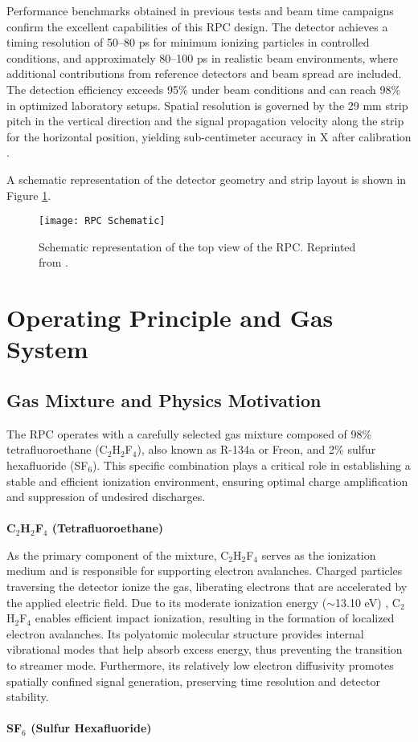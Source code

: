 Performance benchmarks obtained in previous tests and beam time campaigns confirm the excellent capabilities of this RPC design. The detector achieves a timing resolution of 50–80 ps for minimum ionizing particles in controlled conditions, and approximately 80–100 ps in realistic beam environments, where additional contributions from reference detectors and beam spread are included. The detection efficiency exceeds 95\% under beam conditions and can reach 98\% in optimized laboratory setups. Spatial resolution is governed by the 29 mm strip pitch in the vertical direction and the signal propagation velocity along the strip for the horizontal position, yielding sub-centimeter accuracy in X after calibration \cite{blanco_ship_2020, xarepe_resistive_2023}.

A schematic representation of the detector geometry and strip layout is shown in Figure \ref{fig:RPCScheme}.

\begin{figure}[H]
	\centering
	\texttt{[image: RPC Schematic]}
	\caption{Schematic representation of the top view of the RPC. Reprinted from \cite{blanco_ship_2020}.}
	\label{fig:RPCScheme}
\end{figure}
      


\section{Operating Principle and Gas System}

\subsection{Gas Mixture and Physics Motivation}

The \gls{RPC} operates with a carefully selected gas mixture composed of 98\% tetrafluoroethane (C$_2$H$_2$F$_4$), also known as R-134a or Freon, and 2\% sulfur hexafluoride (SF$_6$). This specific combination plays a critical role in establishing a stable and efficient ionization environment, ensuring optimal charge amplification and suppression of undesired discharges.
\\
\\
\textbf{C$_2$H$_2$F$_4$ (Tetrafluoroethane)}

As the primary component of the mixture, C$_2$H$_2$F$_4$ serves as the ionization medium and is responsible for supporting electron avalanches. Charged particles traversing the detector ionize the gas, liberating electrons that are accelerated by the applied electric field. Due to its moderate ionization energy ($\sim$13.10 eV) \cite{pereira-da-silva_electron_2021}, C$_2$H$_2$F$_4$ enables efficient impact ionization, resulting in the formation of localized electron avalanches. Its polyatomic molecular structure provides internal vibrational modes that help absorb excess energy, thus preventing the transition to streamer mode. Furthermore, its relatively low electron diffusivity promotes spatially confined signal generation, preserving time resolution and detector stability.
\\
\\
\textbf{SF$_6$ (Sulfur Hexafluoride)}

